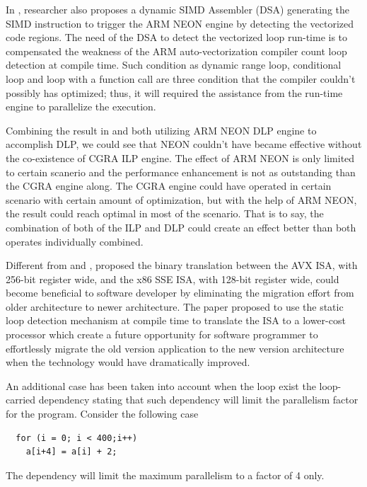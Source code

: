 \documentclass[sigconf, nonacm, natbib=false]{acmart}
\begin{document}
In \parencite{exploiting_longer_simd}, researcher also proposes a dynamic SIMD Assembler (DSA) generating the SIMD instruction to trigger the ARM NEON engine by detecting the vectorized code regions. The need of the DSA to detect the vectorized loop run-time is to compensated the weakness of the ARM auto-vectorization compiler count loop detection at compile time. Such condition as dynamic range loop, conditional loop and loop with a function call are three condition that the compiler couldn't possibly has optimized; thus, it will required the assistance from the run-time engine to parallelize the execution. 

Combining the result in \parencite{exploiting_longer_simd} and \parencite{an_energy_efficient_multitarget} both utilizing ARM NEON DLP engine to accomplish DLP, we could see that NEON couldn't have became effective without the co-existence of CGRA ILP engine. The effect of ARM NEON is only limited to certain scanerio and the performance enhancement is not as outstanding than the CGRA engine along. The CGRA engine could have operated in certain scenario with certain amount of optimization, but with the help of ARM NEON, the result could reach optimal in most of the scenario. That is to say, the combination of both of the ILP and DLP could create an effect better than both operates individually combined. 

Different from \parencite{exploiting_longer_simd} and \parencite{an_energy_efficient_multitarget}, \parencite{dynamic_revectorization} proposed the binary translation between the AVX ISA, with 256-bit register wide, and the x86 SSE ISA, with 128-bit register wide, could become beneficial to software developer by eliminating the migration effort from older architecture to newer architecture. The paper proposed to use the static loop detection mechanism at compile time to translate the ISA to a lower-cost processor which create a future opportunity for software programmer to effortlessly migrate the old version application to the new version architecture when the technology would have dramatically improved.

An additional case has been taken into account when the loop exist the loop-carried dependency stating that such dependency will limit the parallelism factor for the program. Consider the following case
\begin{verbatim}
  for (i = 0; i < 400;i++)
    a[i+4] = a[i] + 2;
\end{verbatim}
The dependency will limit the maximum parallelism to a factor of 4 only. 
\end{document}
